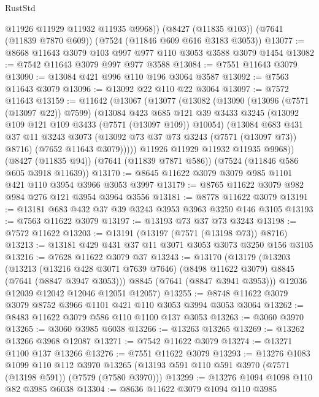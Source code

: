 \begin{lexlean}{RustStd}
\begin{coremodule}
        @11926
        @11929
        @11932
        @11935
        @9968))
    (@8427 (@11835 @103))
    (@7641 (@11839 @7870 @609))
    (@7524 (@11846 @609 @616 @3183 @3053))
@13077 := @8668 @11643 @3079 @103 @997 @977 @110 @3053 @3588 @3079 @1454
@13082 := @7542 @11643 @3079 @997 @977 @3588
@13084 := @7551 @11643 @3079
@13090 := @13084 @421 @996 @110 @196 @3064 @3587
@13092 := @7563 @11643 @3079
@13096 := @13092 @22 @110 @22 @3064
@13097 := @7572 @11643
@13159 := @11642
    (@13067
      (@13077
        (@13082
          (@13090
            (@13096 (@7571 (@13097 @22)) @7599)
            (@13084
              @423
              @685
              @121
              @39
              @3433
              @3245
              (@13092 @109 @121 @109 @3433 (@7571 (@13097 @109)) @10054)
              (@13084
                @683
                @431
                @37
                @11
                @3243
                @3073
                (@13092 @73 @37 @73 @3243 (@7571 (@13097 @73)) @8716)
                (@7652 @11643 @3079)))))
        @11926
        @11929
        @11932
        @11935
        @9968))
    (@8427 (@11835 @94))
    (@7641 (@11839 @7871 @586))
    (@7524 (@11846 @586 @605 @3918 @11639))
@13170 := @8645 @11622 @3079 @3079 @985 @1101 @421 @110 @3954 @3966 @3053 @3997
@13179 := @8765 @11622 @3079 @982 @984 @276 @121 @3954 @3964 @3556
@13181 := @8778 @11622 @3079
@13191 := @13181 @683 @432 @37 @39 @3243 @3953 @3963 @3250 @146 @3105
@13193 := @7563 @11622 @3079
@13197 := @13193 @73 @37 @73 @3243
@13198 := @7572 @11622
@13203 := @13191 (@13197 (@7571 (@13198 @73)) @8716)
@13213 := @13181 @429 @431 @37 @11 @3071 @3053 @3073 @3250 @156 @3105
@13216 := @7628 @11622 @3079 @37
@13243 := @13170
    (@13179
      (@13203
        (@13213
          (@13216 @428 @3071 @7639 @7646)
          (@8498 @11622 @3079)
          @8845
          (@7641 (@8847 @3947 @3053)))
        @8845
        (@7641 (@8847 @3941 @3953)))
      @12036
      @12039
      @12042
      @12046
      @12051
      @12057)
@13255 := @8748 @11622 @3079 @3079 @8752 @3966 @1101 @421 @110 @3053 @3994 @3053 @3064
@13262 := @8483 @11622 @3079 @586 @110 @1100 @137 @3053
@13263 := @3060 @3970
@13265 := @3060 @3985 @6038
@13266 := @13263 @13265
@13269 := @13262 @13266 @3968 @12087
@13271 := @7542 @11622 @3079
@13274 := @13271 @1100 @137 @13266
@13276 := @7551 @11622 @3079
@13293 := @13276
    @1083
    @1099
    @110
    @112
    @3970
    @13265
    (@13193 @591 @110 @591 @3970 (@7571 (@13198 @591)) (@7579 (@7580 @3970)))
@13299 := @13276 @1094 @1098 @110 @82 @3985 @6038
@13304 := @8636 @11622 @3079 @1094 @110 @3985

\end{coremodule}
\end{lexlean}
